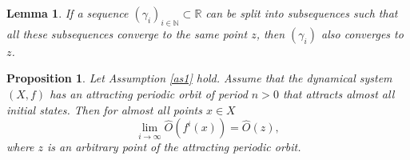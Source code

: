 \documentclass[10pt,a4paper]{amsart}
\newtheorem{proposition}{Proposition}
\newtheorem{lemma}{Lemma}
\def\R{\ensuremath{\mathbb{R}}}
\begin{document}
\begin{lemma}\label{split}
If a sequence $(\gamma_i)_{i \in \mathbb{N}} \subset \R$ can be split
into subsequences such that all these subsequences converge to the
same point $z$, then $(\gamma_i)$ also converges to $z$.
\end{lemma}

\begin{proposition}\label{averages2}
Let Assumption \ref{as1} hold. Assume that the dynamical system $(X,f)$ has an attracting periodic orbit of period $n > 0$ that attracts almost all initial states.
Then for almost all points $x \in X$
\[
\lim_{i\rightarrow \infty} \hat{O}(f^i(x)) = \hat{O}(z),
\]
where $z$ is an arbitrary point of the attracting periodic orbit.
\end{proposition}
\end{document}
